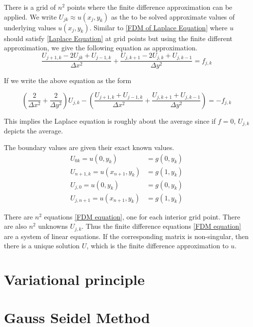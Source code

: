 	There is a grid of $n^2$ points where the finite difference approximation can be applied. We write $U_{jk} \approx u(x_j, y_k)$ as the to be solved approximate values of underlying values $u(x_j, y_k)$. Similar to \eqref{FDM of Laplace Equation} where $u$ should satisfy \eqref{Laplace Equation} at grid points but using the finite different approximation, we give the following equation as approximation.
	\begin{equation}
		\frac{U_{j + 1, k} - 2U_{jk} + U_{j - 1, k}}{\Delta x^2} + \frac{U_{j, k+ 1} - 2U_{j, k} + U_{j, k - 1}}{\Delta y^2} = f_{j, k}
		\label{FDM equation}
	\end{equation}
	
	If we write the above equation as the form
	
	\begin{equation}
		(\frac{2}{\Delta x^2} + \frac{2}{\Delta y^2})U_{j, k} - (\frac{U_{j + 1, k} + U_{j - 1, k}}{\Delta x^2} + \frac{U_{j, k + 1} + U_{j, k - 1}}{\Delta y^2}) = -f_{j, k}
	\end{equation}
	
	This implies the Laplace equation is roughly about the average since if $f = 0$, $U_{j, k}$ depicts the average.
	
	The boundary values are given their exact known values.
	\begin{align*}
		U_{0k} = u(0, y_k) &= g(0, y_k)\\
		U_{n + 1, k} = u(x_{n + 1}, y_k) &= g(1, y_k)\\
		U_{j, 0} = u(0, y_k) &= g(0, y_k)\\
		U_{j, n + 1} = u(x_{n + 1}, y_k) &= g(1, y_k)
	\end{align*}
	
	There are $n^2$ equations \eqref{FDM equation}, one for each interior grid point. There are also $n^2$ unknowns $U_{j, k}$. Thus the finite difference equations \eqref{FDM equation} are a system of linear equations. If the corresponding matrix is non-singular, then there is a unique solution $U$, which is the finite difference approximation to $u$.
	
	
	\section{Variational principle}
	
	\section{Gauss Seidel Method}
	
